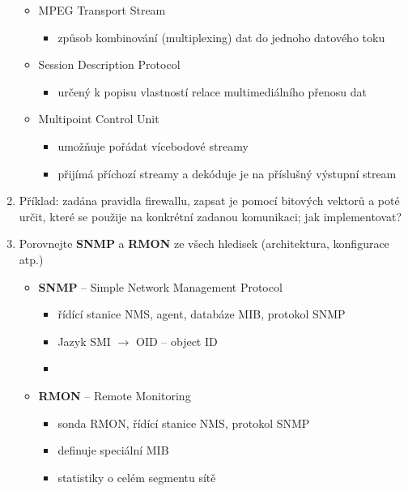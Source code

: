 \documentclass[12pt,a4paper,titlepage,final]{article}
\begin{document}
\begin{enumerate}
\begin{itemize}
		\item MPEG Transport Stream 
		\begin{itemize}
			\item způsob kombinování (multiplexing) dat do jednoho datového toku
		\end{itemize}
		
		\item Session Description Protocol
		\begin{itemize}
			\item určený k popisu vlastností relace multimediálního přenosu dat
		\end{itemize}
		\item Multipoint Control Unit
		\begin{itemize}
			\item umožňuje pořádat vícebodové streamy	
			\item přijímá příchozí streamy a dekóduje je na příslušný výstupní stream
		\end{itemize}
	\end{itemize}
	
	\item Příklad: zadána pravidla firewallu, zapsat je pomocí bitových vektorů a poté určit, které se použije na konkrétní zadanou komunikaci; jak implementovat?
	
	\item Porovnejte \textbf{SNMP} a \textbf{RMON} ze všech hledisek (architektura, konfigurace atp.)
	\begin{itemize}
		\item \textbf{SNMP} -- Simple Network Management Protocol
		\begin{itemize}
			\item řídící stanice NMS, agent, databáze MIB, protokol SNMP
			\item Jazyk SMI $\rightarrow$ OID -- object ID
			\item 
		\end{itemize}	
		
		\item \textbf{RMON} -- Remote Monitoring
		\begin{itemize}
			\item sonda RMON, řídící stanice NMS, protokol SNMP	
			\item definuje speciální MIB
			\item statistiky o celém segmentu sítě
		\end{itemize}


\end{itemize}
\end{enumerate}
\end{document}
